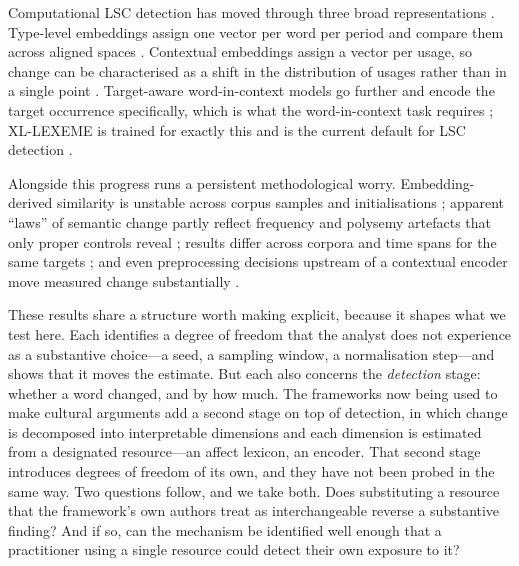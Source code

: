 \documentclass[final]{clv2025}
\begin{document}
Computational LSC detection has moved through three broad representations
\citep[for surveys see][]{tahmasebiSurveyComputationalApproaches2019,tangStateoftheartSemanticChange2018,kutuzovDiachronicWordEmbeddings2018,peritiMontanelliLSCSurvey2024,saSurveyCharacterizingSemantic2026}.
Type-level embeddings assign one vector per word per period and compare them across
aligned spaces \citep{hamilton-etal-2016-diachronic,mikolovDistributed2013}. Contextual
embeddings assign a vector per usage, so change can be characterised as a shift in the
distribution of usages rather than in a single point
\citep{giulianelli-etal-2020-analysing}. Target-aware word-in-context models go further
and encode the target occurrence specifically, which is what the word-in-context task
requires \citep{pilehvar-camacho-collados-2019-wic}; XL-LEXEME is trained for exactly this
and is the current default for LSC detection \citep{cassottiXLLEXEMEWiCPretrained2023}.

Alongside this progress runs a persistent methodological worry. Embedding-derived
similarity is unstable across corpus samples and initialisations
\citep{antoniak-mimno-2018-evaluating}; apparent ``laws'' of semantic change partly reflect
frequency and polysemy artefacts that only proper controls reveal
\citep{dubossarsky-etal-2017-outta}; results differ across corpora and time spans for the
same targets \citep{schlechtweg-etal-2019-wind}; and even preprocessing decisions upstream
of a contextual encoder move measured change substantially
\citep{laicher-etal-2021-explaining}.

These results share a structure worth making explicit, because it shapes what we test
here. Each identifies a degree of freedom that the analyst does not experience as a
substantive choice---a seed, a sampling window, a normalisation step---and shows that it
moves the estimate. But each also concerns the \emph{detection} stage: whether a word
changed, and by how much. The frameworks now being used to make cultural arguments add a
second stage on top of detection, in which change is decomposed into interpretable
dimensions and each dimension is estimated from a designated resource---an affect lexicon,
an encoder. That second stage introduces degrees of freedom of its own, and they have not
been probed in the same way. Two questions follow, and we take both. Does substituting a
resource that the framework's own authors treat as interchangeable reverse a substantive
finding? And if so, can the mechanism be identified well enough that a practitioner using a
single resource could detect their own exposure to it?
\end{document}
